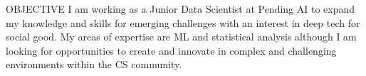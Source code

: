 
\begin{ResumeSection}{OBJECTIVE}
    I am working as a Junior Data Scientist at Pending AI to expand my knowledge and skills for emerging challenges with an interest in deep tech for social good. My areas of expertise are ML and statistical analysis although I am looking for opportunities to create and innovate in complex and challenging environments within the CS community. 
\end{ResumeSection}